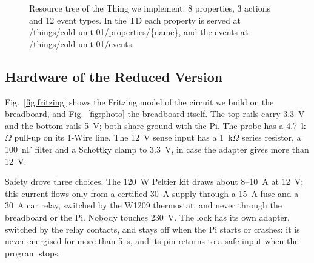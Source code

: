 \documentclass[conference,12pt]{IEEEtran}
\begin{document}
\begin{figure}[!t]
\centering
\begin{minipage}{\columnwidth}
\footnotesize
{}
\end{minipage}
\caption{Resource tree of the Thing we implement: 8 properties, 3 actions and 12 event types. In
the TD each property is served at /things/cold-unit-01/properties/\{name\}, and the events at
/things/cold-unit-01/events.}
\label{fig:tree}
\end{figure}

\subsection{Hardware of the Reduced Version}

Fig.~\ref{fig:fritzing} shows the Fritzing model of the circuit we build on the breadboard, and
Fig.~\ref{fig:photo} the breadboard itself. The top rails carry 3.3~V and the bottom rails 5~V;
both share ground with the Pi. The probe has a 4.7~k$\Omega$ pull-up on its 1-Wire line. The
12~V sense input has a 1~k$\Omega$ series resistor, a 100~nF filter and a Schottky clamp to
3.3~V, in case the adapter gives more than 12~V.

Safety drove three choices. The 120~W Peltier kit draws about 8--10~A at 12~V; this current flows
only from a certified 30~A supply through a 15~A fuse and a 30~A car relay, switched by the W1209
thermostat, and never through the breadboard or the Pi. Nobody touches 230~V. The lock has its own
adapter, switched by the relay contacts, and stays off when the Pi starts or crashes: it is never
energised for more than 5~s, and its pin returns to a safe input when the program stops.
\end{document}
